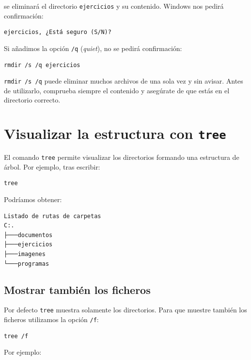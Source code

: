 \documentclass[11pt,a4paper]{article}
\begin{document}
\noindent se eliminará el directorio \texttt{ejercicios} y su contenido. Windows nos pedirá confirmación:

\begin{lstlisting}
ejercicios, ¿Está seguro (S/N)?
\end{lstlisting}

\noindent Si añadimos la opción \texttt{/q} (\textit{quiet}), no se
pedirá confirmación:

\begin{lstlisting}
rmdir /s /q ejercicios
\end{lstlisting}

\begin{peligro}
\texttt{rmdir /s /q} puede eliminar muchos archivos de una sola vez y
sin avisar. Antes de utilizarlo, comprueba siempre el contenido y
asegúrate de que estás en el directorio correcto.
\end{peligro}

\section{Visualizar la estructura con \texttt{tree}}

El comando \texttt{tree} permite visualizar los directorios formando
una estructura de árbol. Por ejemplo, tras escribir:

\begin{lstlisting}
tree
\end{lstlisting}

\noindent Podríamos obtener:

\begin{lstlisting}
Listado de rutas de carpetas
C:.
├───documentos
├───ejercicios
├───imagenes
└───programas
\end{lstlisting}

\subsection{Mostrar también los ficheros}

Por defecto \texttt{tree} muestra solamente los directorios. Para que
muestre también los ficheros utilizamos la opción \texttt{/f}:

\begin{lstlisting}
tree /f
\end{lstlisting}

\noindent Por ejemplo:
\end{document}
